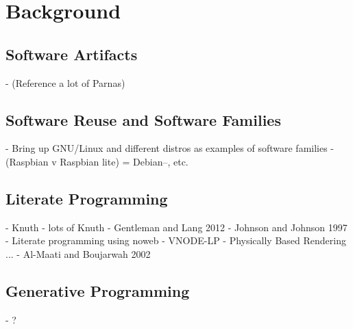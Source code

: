 \chapter{Background}
\section{Software Artifacts}
 -  (Reference a lot of Parnas)
\section{Software Reuse and Software Families}
  - Bring up GNU/Linux and different distros as examples of software families
    - (Raspbian v Raspbian lite) = Debian--, etc.
\section{Literate Programming}
  - Knuth - lots of Knuth
  - Gentleman and Lang 2012
  - Johnson and Johnson 1997 - Literate programming using noweb
  - VNODE-LP
  - Physically Based Rendering ...
  - Al-Maati and Boujarwah 2002
\section{Generative Programming}
 - ?
